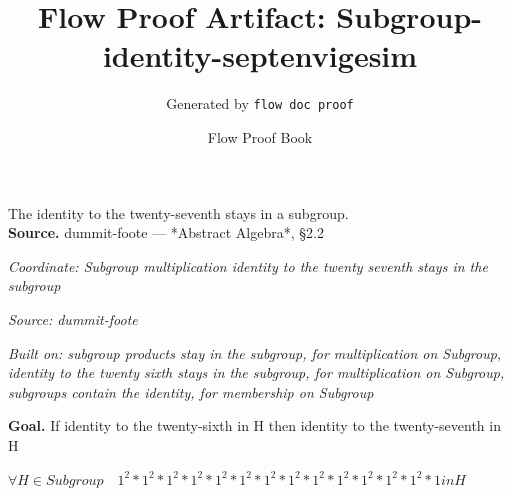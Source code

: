 \documentclass[11pt]{article}
\title{Flow Proof Artifact: Subgroup-identity-septenvigesim}
\author{Generated by \texttt{flow doc proof}}
\date{Flow Proof Book}
\theoremstyle{definition}
\begin{document}
\maketitle
The identity to the twenty-seventh stays in a subgroup.\\[0.5em]
\textbf{Source.} dummit-foote — *Abstract Algebra*, §2.2\\[0.5em]
\bigskip
{}\par
\smallskip\noindent\textit{Coordinate: Subgroup \cdot multiplication \cdot identity to the twenty seventh stays in the subgroup}\par
\smallskip\noindent\textit{Source: dummit-foote}\par
\smallskip\noindent\textit{Built on: subgroup products stay in the subgroup, for multiplication on Subgroup, identity to the twenty sixth stays in the subgroup, for multiplication on Subgroup, subgroups contain the identity, for membership on Subgroup}\par
\medskip
\noindent\textbf{Goal.} If identity to the twenty-sixth in H then identity to the twenty-seventh in H\par
\noindent$\displaystyle \forall H \in Subgroup\quad 1^{2} * 1^{2} * 1^{2} * 1^{2} * 1^{2} * 1^{2} * 1^{2} * 1^{2} * 1^{2} * 1^{2} * 1^{2} * 1^{2} * 1^{2} * 1 in H$\par
\medskip
\noindent
\end{document}
